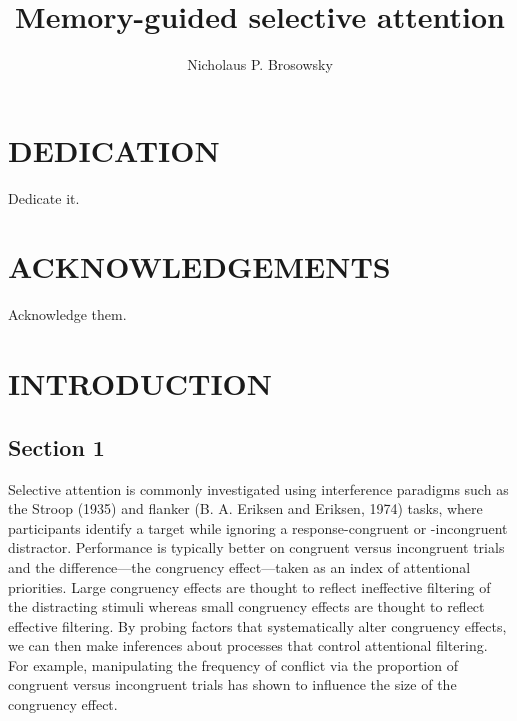 \documentclass[]{DissertateCUNY}
\title{Memory-guided selective attention}
\author{Nicholaus P. Brosowsky}
\date{}
\begin{document}
\maketitle

\copyrightpage
\abstractpage

\newpage

 \fancyhead[R]{\thepage} \fancyfoot[C]{}
\chapter*{DEDICATION} 

Dedicate it.

\newpage

 \fancyhead[R]{\thepage} \fancyfoot[C]{}
\chapter*{ACKNOWLEDGEMENTS}

Acknowledge them.

\newpage

 \fancyhead[R]{\thepage} \fancyfoot[C]{}
\tableofcontents

\newpage

 \fancyhead[R]{\thepage} \fancyfoot[C]{}
\listoftables

\newpage

 \fancyhead[R]{\thepage} \fancyfoot[C]{}
\listoffigures

\newpage


\newpage

 \fancyhead[R]{\thepage} \fancyfoot[C]{}

\chapter{INTRODUCTION}

\section{Section 1}\label{section-1}

Selective attention is commonly investigated using interference
paradigms such as the Stroop (1935) and flanker (B. A. Eriksen and
Eriksen, 1974) tasks, where participants identify a target while
ignoring a response-congruent or -incongruent distractor. Performance is
typically better on congruent versus incongruent trials and the
difference---the congruency effect---taken as an index of attentional
priorities. Large congruency effects are thought to reflect ineffective
filtering of the distracting stimuli whereas small congruency effects
are thought to reflect effective filtering. By probing factors that
systematically alter congruency effects, we can then make inferences
about processes that control attentional filtering. For example,
manipulating the frequency of conflict via the proportion of congruent
versus incongruent trials has shown to influence the size of the
congruency effect.
\end{document}
